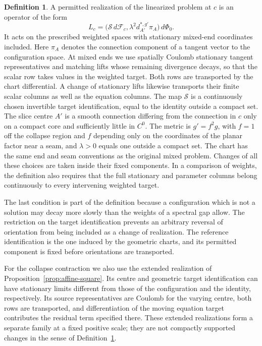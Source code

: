 \documentclass[11pt]{amsart}
\theoremstyle{definition}
\newtheorem{definition}[theorem]{Definition}
\theoremstyle{remark}
\theoremstyle{plain}
\numberwithin{equation}{section}
\begin{document}
\begin{definition}\label{def:realization}
A permitted realization of the linearized problem at $c$
is an operator of the form
\begin{equation}\label{eq:realization}
 L_c=\bigl(\mathcal S\,d\mathcal F_c,
              \lambda^2d_{A'}^{*,g'}\pi_A\bigr)\,d\Phi_0.
\end{equation}
It acts on the prescribed weighted spaces with stationary
mixed-end coordinates included. Here $\pi_A$ denotes the connection
component of a tangent vector to the configuration space. At mixed
ends we use spatially Coulomb stationary tangent representatives and
matching lifts whose remaining divergence decays, so that the scalar
row takes values in the weighted target. Both rows are transported
by the chart differential. A change of stationary lifts likewise
transports their finite scalar columns as well as the equation
columns. The map $\mathcal S$ is a continuously chosen invertible
target identification, equal to the identity outside a compact set.
The slice centre $A'$ is a smooth connection differing from the
connection in $c$ only on a compact core and sufficiently little in
$C^0$. The metric is $g'=f^2g$, with $f=1$ off the collapse region
and $f$ depending only on the coordinates of the planar factor near a
seam, and $\lambda>0$ equals one outside a compact set. The chart has
the same end and seam conventions as the original mixed problem.
Changes of all these choices are taken inside their fixed components.
In a comparison of weights, the definition also requires that the full
stationary and parameter columns belong continuously to every
intervening weighted target.
\end{definition}

The last condition is part of the definition because a configuration
which is not a solution may decay more slowly than the weights of a
spectral gap allow. The restriction on the target identification
prevents an arbitrary reversal of orientation from being included as
a change of realization. The reference identification is the one
induced by the geometric charts, and its permitted component is fixed
before orientations are transported.

For the collapse contraction we also use the extended realization
of Proposition~\ref{prop:affine-square}. Its centre and geometric
target identification can have stationary limits different from
those of the configuration and the identity, respectively. Its
source representatives are Coulomb for the varying centre, both
rows are transported, and differentiation of the moving equation
target contributes the residual term specified there. These extended
realizations form a separate family at a fixed positive scale; they
are not compactly supported changes in the sense of
Definition~\ref{def:realization}.
\end{document}
